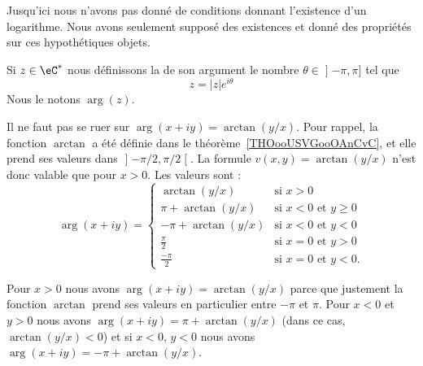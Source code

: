 \begin{remark}
	Jusqu'ici nous n'avons pas donné de conditions donnant l'existence d'un logarithme. Nous avons seulement supposé des existences et donné des propriétés sur ces hypothétiques objets.
\end{remark}

\begin{definition}
	Si \( z\in \eC^*\) nous définissons la  de son argument le nombre \( \theta\in \mathopen] -\pi , \pi \mathclose]\) tel que
	\begin{equation}
		z=| z | e^{i\theta}
	\end{equation}
	Nous le notons \( \arg(z)\).
\end{definition}

\begin{normaltext}      \label{NORMooOGHNooYriCBH}
	Il ne faut pas se ruer sur \( \arg(x+iy)=\arctan(y/x)\). Pour rappel, la fonction \( \arctan\) a été définie dans le théorème~\ref{THOooUSVGooOAnCvC}, et elle prend ses valeurs dans \( \mathopen] -\pi/2 , \pi/2 \mathclose[\). La formule \( v(x,y)=\arctan(y/x)\) n'est donc valable que pour \( x>0\). Les valeurs sont :
	\begin{equation}        \label{EQooPJVFooSEKTny}
		\arg(x+iy)=\begin{cases}
			\arctan(y/x)       & \text{si } x>0                   \\
			\pi+\arctan(y/x)   & \text{si } x<0\text{ et }y\geq 0 \\
			-\pi+\arctan(y/x)  & \text{si } x<0 \text{ et }y<0    \\
			\frac{ \pi }{ 2 }  & \text{si } x=0 \text{ et }y>0    \\
			\frac{- \pi }{ 2 } & \text{si } x=0 \text{ et }y<0.
		\end{cases}
	\end{equation}

	Pour \( x>0\) nous avons \( \arg(x+iy)=\arctan(y/x)  \) parce que justement la fonction \( \arctan\) prend ses valeurs en particulier entre \( -\pi\) et \( \pi\). Pour \( x<0\) et \( y>0 \) nous avons \( \arg(x+iy)=\pi+\arctan(y/x)\) (dans ce cas, \( \arctan(y/x)<0\)) et si \( x<0\), \( y<0\) nous avons \( \arg(x+iy)=-\pi+\arctan(y/x)\).
\end{normaltext}

